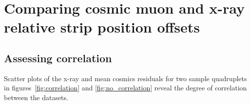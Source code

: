 
\chapter{Comparing cosmic muon and x-ray relative strip position offsets}
\label{chap:comparison}



\section{Assessing correlation}
\label{sec:assessing_correlation}
Scatter plots of the x-ray and mean cosmics residuals for two sample quadruplets in figures~\ref{fig:correlation} and \ref{fig:no_correlation} reveal the degree of correlation between the datasets.


